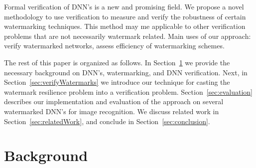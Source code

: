 \documentclass[a4paper]{easychair}
\begin{document}
Formal verification of DNN's is a new and promising field. We propose a novel methodology to use verification to measure and verify the robustness of certain watermarking techniques. This method may me applicable to other verification problems that are not necessarily watermark related. 
Main uses of our approach: verify watermarked networks, assess efficiency of watermarking schemes.

The rest of this paper is organized as follows. In
Section~\ref{sec:background} we provide the necessary background on DNN's, watermarking, and DNN verification. Next, in
Section~\ref{sec:verifyWatermarks} we introduce our technique for
casting the watermark resilience problem into a verification
problem. Section~\ref{sec:evaluation} describes our implementation and evaluation of the approach on several watermarked DNN's for image
recognition. We discuss related work in Section~\ref{sec:relatedWork},
and conclude in Section~\ref{sec:conclusion}.

\section{Background}
\label{sec:background}
\end{document}

